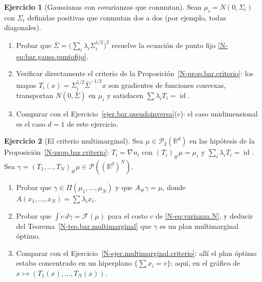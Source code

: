 \documentclass[11pt,a4paper]{amsart}
\newcounter{chapter}
\newcommand{\id}{\operatorname{id}}
\newcommand{\R}{{\mathbb R}}
\theoremstyle{remark}
\theoremstyle{definition}
\newtheorem{ejercicio}{Ejercicio}[chapter]
\numberwithin{subsection}{section}
\numberwithin{equation}{section}
\begin{document}
\begin{ejercicio}[Gaussianas con covarianzas que conmutan]\label{ejer.bar.gauss.conmutan}
Sean $\mu_i=N(0,\Sigma_i)$ con $\Sigma_i$ definidas positivas que conmutan
dos a dos (por ejemplo, todas diagonales).
\begin{enumerate}[label=(\alph*)]
\item Probar que $\bar\Sigma=\bigl(\sum_i\lambda_i\Sigma_i^{1/2}\bigr)^2$
resuelve la ecuación de punto fijo \eqref{N-eq:bar.gauss.puntofijo}.
\item Verificar directamente el criterio de la
Proposición~\ref{N-prop.bar.criterio}: los mapas $T_i(x)=\Sigma_i^{1/2}\bar\Sigma^{-1/2}x$
son gradientes de funciones convexas, transportan $N(0,\bar\Sigma)$ en
$\mu_i$ y satisfacen $\sum\lambda_iT_i=\id$.
\item Comparar con el Ejercicio~\ref{ejer.bar.pseudoinversa}(c): el caso
unidimensional es el caso $d=1$ de este ejercicio.
\end{enumerate}
\end{ejercicio}

\begin{ejercicio}[El criterio multimarginal]\label{ejer.bar.criterio.multimarginal}
Sea $\mu\in\mathcal P_2(\R^d)$ en las hipótesis de la
Proposición~\ref{N-prop.bar.criterio}: $T_i=\nabla u_i$ con $(T_i)_\#\mu=\mu_i$
y $\sum_i\lambda_iT_i=\id$. Sea $\gamma=(T_1,\dots,T_N)_\#\mu\in\mathcal P((\R^d)^N)$.
\begin{enumerate}[label=(\alph*)]
\item Probar que $\gamma\in\Pi(\mu_1,\dots,\mu_N)$ y que $A_\#\gamma=\mu$,
donde $A(x_1,\dots,x_N)=\sum\lambda_ix_i$.
\item Probar que $\int c\,d\gamma=\mathcal F(\mu)$ para el costo $c$ de
\eqref{N-eq:varianza.N}, y deducir del Teorema~\ref{N-teo.bar.multimarginal}
que $\gamma$ es un plan multimarginal óptimo.
\item Comparar con el Ejercicio~\ref{N-ejer.multimarginal.criterio}: allí el
plan óptimo estaba concentrado en un hiperplano $\{\sum x_i=v\}$; aquí, en
el gráfico de $x\mapsto(T_1(x),\dots,T_N(x))$.
\end{enumerate}
\end{ejercicio}
\end{document}

